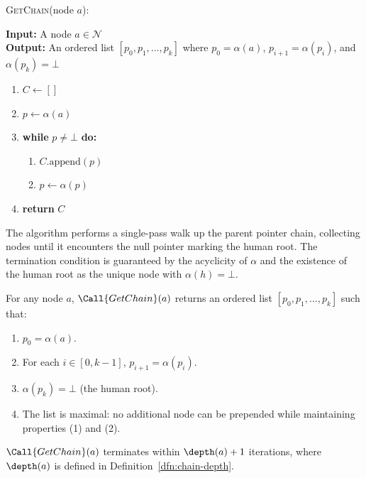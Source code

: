 \begin{algorithm}
\label{alg:chain-traversal}
\textsc{GetChain}(node $a$):
\begin{tabbing}
\textbf{Input:} A node $a \in \mathcal{N}$ \\
\textbf{Output:} An ordered list $[p_0, p_1, \ldots, p_k]$ where $p_0 = \alpha(a)$, $p_{i+1} = \alpha(p_i)$, and $\alpha(p_k) = \bot$
\end{tabbing}
\begin{enumerate}
    \item $C \leftarrow []$
    \item $p \leftarrow \alpha(a)$
    \item \textbf{while } $p \neq \bot$ \textbf{do:}
        \begin{enumerate}
            \item $C.\text{append}(p)$
            \item $p \leftarrow \alpha(p)$
        \end{enumerate}
    \item \textbf{return } $C$
\end{enumerate}
\end{algorithm}

The algorithm performs a single-pass walk up the parent pointer chain, collecting nodes until it encounters the null pointer marking the human root. The termination condition is guaranteed by the acyclicity of $\alpha$ and the existence of the human root as the unique node with $\alpha(h) = \bot$.

\begin{prop}
\label{prop:chain-traversal-correct}
For any node $a$, $\Call{GetChain}(a)$ returns an ordered list $[p_0, p_1, \ldots, p_k]$ such that:
\begin{enumerate}
    \item $p_0 = \alpha(a)$.
    \item For each $i \in [0, k-1]$, $p_{i+1} = \alpha(p_i)$.
    \item $\alpha(p_k) = \bot$ (the human root).
    \item The list is maximal: no additional node can be prepended while maintaining properties (1) and (2).
\end{enumerate}
\end{prop}

\begin{prop}
\label{prop:bounded-termination}
$\Call{GetChain}(a)$ terminates within $\depth(a) + 1$ iterations, where $\depth(a)$ is defined in Definition~\ref{dfn:chain-depth}.
\end{prop}

